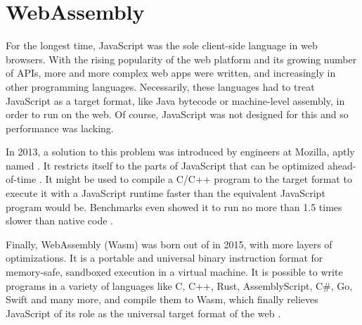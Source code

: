 \section{WebAssembly}


For the longest time, JavaScript was the sole client-side language in web browsers. With the rising popularity of the web platform and its growing number of APIs, more and more complex web apps were written, and increasingly in other programming languages. Necessarily, these languages had to treat JavaScript as a target format, like Java bytecode or machine-level assembly, in order to run on the web. Of course, JavaScript was not designed for this and so performance was lacking.

In 2013, a solution to this problem was introduced by engineers at Mozilla, aptly named . It restricts itself to the parts of JavaScript that can be optimized ahead-of-time \cite{Herman2014}. It might be used to compile a C/C++ program to the  target format to execute it with a JavaScript runtime faster than the equivalent JavaScript program would be. Benchmarks even showed it to run no more than 1.5 times slower than native code \cite{Zakai2013}.

Finally, WebAssembly (Wasm) was born out of  in 2015, with more layers of optimizations. It is a portable and universal binary instruction format for memory-safe, sandboxed execution in a virtual machine.
It is possible to write programs in a variety of languages like C, C++, Rust, AssemblyScript, C\#, Go, Swift and many more, and compile them to Wasm, which finally relieves JavaScript of its role as the universal target format of the web \cite{W3C2020}.


